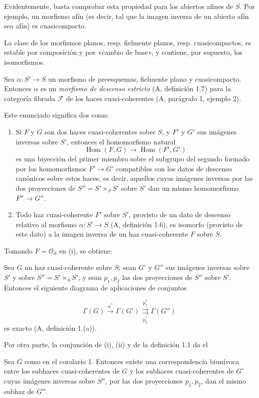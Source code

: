 Evidentemente, basta comprobar esta propiedad para los abiertos afines de $S$.
Por ejemplo, un morfismo afín (es decir, tal que la imagen inversa de un abierto
afín sea afín) es cuasicompacto.

La clase de los morfismos planos, resp. fielmente planos, resp. cuasicompactos,
es estable por composición y por «cambio de base», y contiene, por supuesto,
los isomorfismos.

 Sea $\alpha:S'\longrightarrow S$ un morfismo de
preesquemas, fielmente plano y cuasicompacto. Entonces $\alpha$ es un
\emph{morfismo de descenso estricto} (A, definición 1.7) para la categoría
fibrada $\mathcal F$ de los haces cuasi-coherentes (A, parágrafo 1, ejemplo 2).

Este enunciado significa dos cosas:
\begin{enumerate}
\item[(i)] Si $F$ y $G$ son dos haces cuasi-coherentes sobre $S$, y $F'$ y
$G'$ sus imágenes inversas sobre $S'$, entonces el homomorfismo natural
\[
  \operatorname{Hom}(F,G)\longrightarrow\operatorname{Hom}(F',G')
\]
es una biyección del primer miembro sobre el subgrupo del segundo formado por
los homomorfismos $F'\longrightarrow G'$ compatibles con los datos de descenso
canónicos sobre estos haces, es decir, aquellos cuyas imágenes inversas por
las dos proyecciones de $S''=S'\times_SS'$ sobre $S'$ dan un mismo
homomorfismo $F''\longrightarrow G''$.
\item[(ii)] Todo haz cuasi-coherente $F'$ sobre $S'$, provisto de un dato de
descenso relativo al morfismo $\alpha:S'\longrightarrow S$
(A, definición 1.6), es isomorfo (provisto de este dato) a la imagen inversa de
un haz cuasi-coherente $F$ sobre $S$.
\end{enumerate}
Tomando $F=\mathcal O_S$ en (i), se obtiene:

 Sea $G$ un haz cuasi-coherente sobre $S$; sean
$G'$ y $G''$ sus imágenes inversas sobre $S'$ y sobre
$S''=S'\times_SS'$, y sean $p_1,p_2$ las dos proyecciones de $S''$ sobre
$S'$. Entonces el siguiente diagrama de aplicaciones de conjuntos

\[
  \Gamma(G)\xrightarrow{\alpha^*}\Gamma(G')
  \underset{p_2^*}{\overset{p_1^*}{\rightrightarrows}}\Gamma(G'')
\]
es exacto (A, definición 1.(a)).

Por otra parte, la conjunción de (i), (ii) y de la definición 1.1 da el

 Sea $G$ como en el corolario 1. Entonces existe una
correspondencia biunívoca entre los subhaces cuasi-coherentes de $G$ y los
subhaces cuasi-coherentes de $G'$ cuyas imágenes inversas sobre $S''$, por las
dos proyecciones $p_1,p_2$, dan el mismo subhaz de $G''$.

